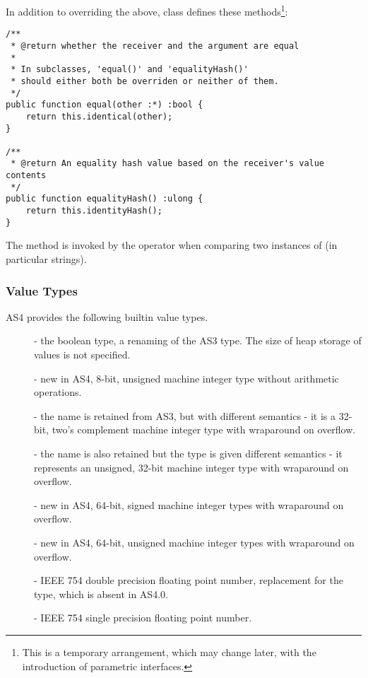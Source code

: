 In addition to overriding the above, class  defines
these methods\footnote{ This is a temporary arrangement, which may change later, with
the introduction of parametric interfaces.}:
\begin{verbatim}
/**
 * @return whether the receiver and the argument are equal
 *
 * In subclasses, 'equal()' and 'equalityHash()'
 * should either both be overriden or neither of them.
 */
public function equal(other :*) :bool {
    return this.identical(other);
}

/**
 * @return An equality hash value based on the receiver's value contents
 */
public function equalityHash() :ulong {
    return this.identityHash();
}
\end{verbatim}
The method  is invoked by the \code{==} operator when comparing two
instances of  (in particular strings).

\subsubsection{Value Types}
\label{sec:value-types}

AS4 provides the following builtin value types.
\begin{description}
\item[] - the boolean type, a renaming of the AS3
   type. The size of heap storage of  values
  is not specified.
\item[]- new in AS4, 8-bit, unsigned machine integer type without
arithmetic operations.
\item[] - the name is retained from AS3, but with
  different semantics - it is a 32-bit, two's complement machine
  integer type with wraparound on overflow.
  \item[] - the name is also retained but the type is
  given different semantics - it represents an unsigned, 32-bit
  machine integer type with wraparound on overflow.
  \item[] - new in AS4, 64-bit, signed machine integer types with
  wraparound on overflow.
  \item[] - new in AS4, 64-bit, unsigned machine integer types with
  wraparound on overflow.
  \item[]  - IEEE 754 double precision floating point
  number, replacement for the  type, which is absent in
  AS4.0.
 \item[]  - IEEE 754 single precision floating point
  number.
\end{description}

